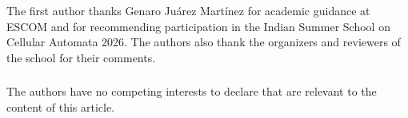 \begin{credits}
\subsubsection{\ackname}
The first author thanks Genaro Juárez Martínez for academic guidance at ESCOM and for recommending participation in the Indian Summer School on Cellular Automata 2026. The authors also thank the organizers and reviewers of the school for their comments.

\subsubsection{\discintname}
The authors have no competing interests to declare that are relevant to
the content of this article.
\end{credits}

